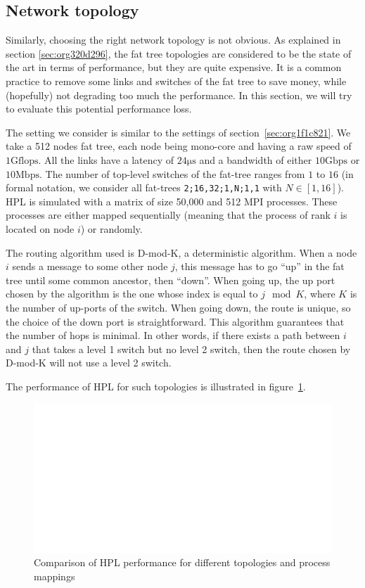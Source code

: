 \documentclass[12pt, a4paper]{memoir}
\begin{document}
\subsection{Network topology}
\label{sec:orgfc3fe51}
Similarly, choosing the right network topology is not obvious. As explained in section \ref{sec:org320d296}, the fat
tree topologies are considered to be the state of the art in terms of performance, but they are quite expensive. It
is a common practice to remove some links and switches of the fat tree to save money, while (hopefully) not
degrading too much the performance. In this section, we will try to evaluate this potential performance loss.

The setting we consider is similar to the settings of section~\ref{sec:org1f1c821}. We take a 512 nodes fat tree, each
node being mono-core and having a raw speed of \(1 \mathrm{Gflops}\). All the links have a latency of \(24\mathrm{\mu s}\)
and a bandwidth of either \(10 \mathrm{Gbps}\) or \(10 \mathrm{Mbps}\). The number of top-level switches of the fat-tree
ranges from \(1\) to \(16\) (in formal notation, we consider all fat-trees \texttt{2;16,32;1,N;1,1} with \(N \in [1, 16]\)). HPL is
simulated with a matrix of size 50,000 and 512 MPI processes. These processes are either mapped sequentially
(meaning that the process of rank \(i\) is located on node \(i\)) or randomly.

The routing algorithm used is D-mod-K\cite{Zahavi10}, a deterministic algorithm. When a node \(i\) sends a message to
some other node \(j\), this message has to go “up” in the fat tree until some common ancestor, then “down”. When going
up, the up port chosen by the algorithm is the one whose index is equal to \(j \mod K\), where \(K\) is the number of
up-ports of the switch. When going down, the route is unique, so the choice of the down port is
straightforward. This algorithm guarantees that the number of hops is minimal. In other words, if there exists a
path between \(i\) and \(j\) that takes a level 1 switch but no level 2 switch, then the route chosen by D-mod-K will
not use a level 2 switch.

The performance of HPL for such topologies is illustrated in figure~\ref{fig:capacity_planning_topology}.
\begin{figure}[htpb]
\centering
\includegraphics[width=\linewidth, page=2]{../capacity_planning/topology.pdf}
\caption{Comparison of HPL performance for different topologies and process mappings}
\label{fig:capacity_planning_topology}
\end{figure}
\end{document}
